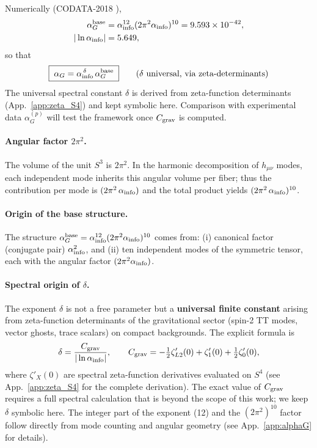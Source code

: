 \documentclass{article}
\numberwithin{equation}{section}
\theoremstyle{plain}
\theoremstyle{definition}
\theoremstyle{remark}
\begin{document}
\medskip
\noindent Numerically (CODATA-2018 \cite{CODATA2018}),
\begin{align}
\alpha_G^{\rm base} &= \alpha_{\rm info}^{12}(2\pi^2\alpha_{\rm info})^{10} = 9.593\times 10^{-42},\\
|\ln\alpha_{\rm info}| &= 5.649,
\end{align}
so that
\begin{equation}
\boxed{\;\alpha_G=\alpha_{\rm info}^{\,\delta}\,\alpha_G^{\rm base}\;}\qquad (\delta\ \text{universal, via zeta-determinants})
\label{eq:delta_value}
\end{equation}
The universal spectral constant $\delta$ is derived from zeta-function determinants (App.~\ref{app:zeta_S4}) and kept symbolic here. Comparison with experimental data $\alpha_G^{(p)}$ will test the framework once $C_{\rm grav}$ is computed.

\paragraph{Angular factor $2\pi^2$.}
The volume of the unit $S^3$ is $2\pi^2$. In the harmonic decomposition of $h_{\mu\nu}$ modes, each independent mode inherits this angular volume per fiber; thus the contribution per mode is $(2\pi^2\,\alpha_{\rm info})$ and the total product yields $(2\pi^2\,\alpha_{\rm info})^{10}$.

\paragraph{Origin of the base structure.}
The structure $\alpha_G^{\rm base}=\alpha_{\rm info}^{12}(2\pi^2\alpha_{\rm info})^{10}$ comes from: (i) canonical factor (conjugate pair) $\alpha_{\rm info}^2$, and (ii) ten independent modes of the symmetric tensor, each with the angular factor $(2\pi^2\alpha_{\rm info})$.

\paragraph{Spectral origin of $\delta$.}
The exponent $\delta$ is not a free parameter but a \textbf{universal finite constant} arising from zeta-function determinants of the gravitational sector (spin-2 TT modes, vector ghosts, trace scalars) on compact backgrounds. The explicit formula is
\begin{equation}
\delta = \frac{C_{\rm grav}}{|\ln\alpha_{\rm info}|},
\qquad
C_{\rm grav} = -\tfrac{1}{2}\zeta'_{L2}(0) + \zeta'_1(0) + \tfrac{1}{2}\zeta'_0(0),
\label{eq:delta_spectral}
\end{equation}
where $\zeta'_X(0)$ are spectral zeta-function derivatives evaluated on $S^4$ (see App.~\ref{app:zeta_S4} for the complete derivation). The exact value of $C_{\rm grav}$ requires a full spectral calculation that is beyond the scope of this work; we keep $\delta$ symbolic here. The integer part of the exponent (12) and the $(2\pi^2)^{10}$ factor follow directly from mode counting and angular geometry (see App.~\ref{app:alphaG} for details).
\end{document}

